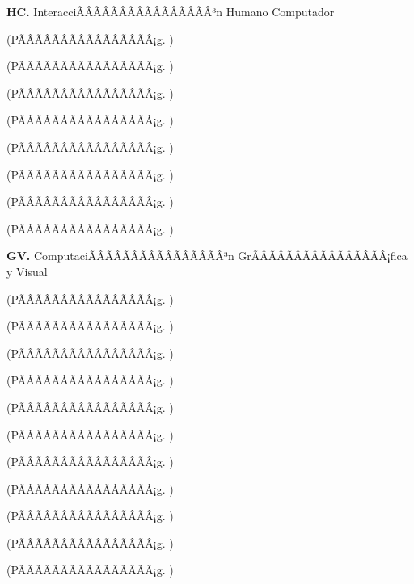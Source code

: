 	\textbf{HC.}  InteracciÃÂÃÂÃÂÃÂÃÂÃÂÃÂÃÂ³n Humano Computador%
	\begin{list}{}{%
		\setlength{\labelwidth}{0pt}%
		\setlength{\leftmargin}{15pt}}%
		\item \HCUNODef(PÃÂÃÂÃÂÃÂÃÂÃÂÃÂÃÂ¡g. \pageref{sec:BOK-HC1})
		\item \HCDOSDef(PÃÂÃÂÃÂÃÂÃÂÃÂÃÂÃÂ¡g. \pageref{sec:BOK-HC2})
		\item \HCTRESDef(PÃÂÃÂÃÂÃÂÃÂÃÂÃÂÃÂ¡g. \pageref{sec:BOK-HC3})
		\item \HCCUATRODef(PÃÂÃÂÃÂÃÂÃÂÃÂÃÂÃÂ¡g. \pageref{sec:BOK-HC4})
		\item \HCCINCODef(PÃÂÃÂÃÂÃÂÃÂÃÂÃÂÃÂ¡g. \pageref{sec:BOK-HC5})
		\item \HCSEISDef(PÃÂÃÂÃÂÃÂÃÂÃÂÃÂÃÂ¡g. \pageref{sec:BOK-HC6})
		\item \HCSIETEDef(PÃÂÃÂÃÂÃÂÃÂÃÂÃÂÃÂ¡g. \pageref{sec:BOK-HC7})
		\item \HCOCHODef(PÃÂÃÂÃÂÃÂÃÂÃÂÃÂÃÂ¡g. \pageref{sec:BOK-HC8})
	\end{list}%
	\textbf{GV.}  ComputaciÃÂÃÂÃÂÃÂÃÂÃÂÃÂÃÂ³n GrÃÂÃÂÃÂÃÂÃÂÃÂÃÂÃÂ¡fica y Visual%
	\begin{list}{}{%
		\setlength{\labelwidth}{0pt}%
		\setlength{\leftmargin}{15pt}}%
		\item \GVUNODef(PÃÂÃÂÃÂÃÂÃÂÃÂÃÂÃÂ¡g. \pageref{sec:BOK-GV1})
		\item \GVDOSDef(PÃÂÃÂÃÂÃÂÃÂÃÂÃÂÃÂ¡g. \pageref{sec:BOK-GV2})
		\item \GVTRESDef(PÃÂÃÂÃÂÃÂÃÂÃÂÃÂÃÂ¡g. \pageref{sec:BOK-GV3})
		\item \GVCUATRODef(PÃÂÃÂÃÂÃÂÃÂÃÂÃÂÃÂ¡g. \pageref{sec:BOK-GV4})
		\item \GVCINCODef(PÃÂÃÂÃÂÃÂÃÂÃÂÃÂÃÂ¡g. \pageref{sec:BOK-GV5})
		\item \GVSEISDef(PÃÂÃÂÃÂÃÂÃÂÃÂÃÂÃÂ¡g. \pageref{sec:BOK-GV6})
		\item \GVSIETEDef(PÃÂÃÂÃÂÃÂÃÂÃÂÃÂÃÂ¡g. \pageref{sec:BOK-GV7})
		\item \GVOCHODef(PÃÂÃÂÃÂÃÂÃÂÃÂÃÂÃÂ¡g. \pageref{sec:BOK-GV8})
		\item \GVNUEVEDef(PÃÂÃÂÃÂÃÂÃÂÃÂÃÂÃÂ¡g. \pageref{sec:BOK-GV9})
		\item \GVDIEZDef(PÃÂÃÂÃÂÃÂÃÂÃÂÃÂÃÂ¡g. \pageref{sec:BOK-GV10})
		\item \GVONCEDef(PÃÂÃÂÃÂÃÂÃÂÃÂÃÂÃÂ¡g. \pageref{sec:BOK-GV11})
	\end{list}%
